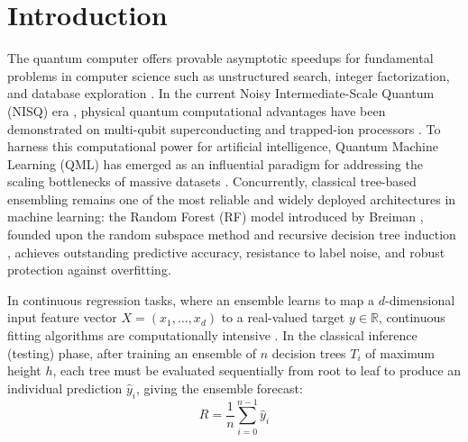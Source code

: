 \documentclass[sn-mathphys,Numbered]{sn-jnl}
\theoremstyle{thmstyleone}
\theoremstyle{thmstyletwo}
\theoremstyle{thmstylethree}
\begin{document}

\maketitle
\thispagestyle{empty}
\pagestyle{empty}

\section{Introduction}\label{sec1}

The quantum computer offers provable asymptotic speedups for fundamental problems in computer science such as unstructured search, integer factorization, and database exploration \cite{nielsen2010quantum}. In the current Noisy Intermediate-Scale Quantum (NISQ) era \cite{preskill2018quantum}, physical quantum computational advantages have been demonstrated on multi-qubit superconducting and trapped-ion processors \cite{arute2019quantum}. To harness this computational power for artificial intelligence, Quantum Machine Learning (QML) has emerged as an influential paradigm for addressing the scaling bottlenecks of massive datasets \cite{biamonte2017quantum,cerezo2021variational}. Concurrently, classical tree-based ensembling remains one of the most reliable and widely deployed architectures in machine learning: the Random Forest (RF) model introduced by Breiman \cite{breiman2001random}, founded upon the random subspace method \cite{ho1998random} and recursive decision tree induction \cite{quinlan1986induction}, achieves outstanding predictive accuracy, resistance to label noise, and robust protection against overfitting.

In continuous regression tasks, where an ensemble learns to map a $d$-dimensional input feature vector $X = (x_1, \dots, x_d)$ to a real-valued target $y \in \mathbb{R}$, continuous fitting algorithms are computationally intensive \cite{wiebe2012quantum,mitarai2018quantum}. In the classical inference (testing) phase, after training an ensemble of $n$ decision trees $T_i$ of maximum height $h$, each tree must be evaluated sequentially from root to leaf to produce an individual prediction $\hat{y}_i$, giving the ensemble forecast:
\begin{equation}\label{eq1}
R = \frac{1}{n} \sum_{i=0}^{n-1} \hat{y}_i
\end{equation}
\end{document}
